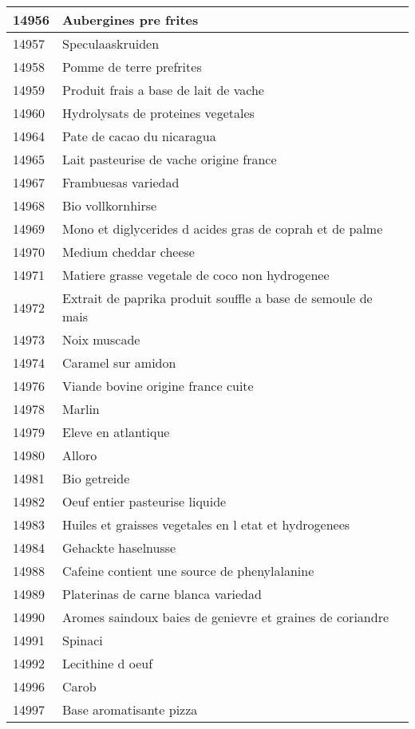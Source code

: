 \begin{longtable}{|l|l|}
14956 & Aubergines pre frites \\ \hline 
14957 & Speculaaskruiden \\ \hline 
14958 & Pomme de terre prefrites \\ \hline 
14959 & Produit frais a base de lait de vache \\ \hline 
14960 & Hydrolysats de proteines vegetales \\ \hline 
14964 & Pate de cacao du nicaragua \\ \hline 
14965 & Lait pasteurise de vache origine france \\ \hline 
14967 & Frambuesas variedad \\ \hline 
14968 & Bio vollkornhirse \\ \hline 
14969 & Mono et diglycerides d acides gras de coprah et de palme \\ \hline 
14970 & Medium cheddar cheese \\ \hline 
14971 & Matiere grasse vegetale de coco non hydrogenee \\ \hline 
14972 & Extrait de paprika produit souffle a base de semoule de mais \\ \hline 
14973 & Noix muscade \\ \hline 
14974 & Caramel sur amidon \\ \hline 
14976 & Viande bovine origine france cuite \\ \hline 
14978 & Marlin \\ \hline 
14979 & Eleve en atlantique \\ \hline 
14980 & Alloro \\ \hline 
14981 & Bio getreide \\ \hline 
14982 & Oeuf entier pasteurise liquide \\ \hline 
14983 & Huiles et graisses vegetales en l etat et hydrogenees \\ \hline 
14984 & Gehackte haselnusse \\ \hline 
14988 & Cafeine contient une source de phenylalanine \\ \hline 
14989 & Platerinas de carne blanca variedad \\ \hline 
14990 & Aromes saindoux baies de genievre et graines de coriandre \\ \hline 
14991 & Spinaci \\ \hline 
14992 & Lecithine d oeuf \\ \hline 
14996 & Carob \\ \hline 
14997 & Base aromatisante pizza \\ \hline 

\end{longtable}
